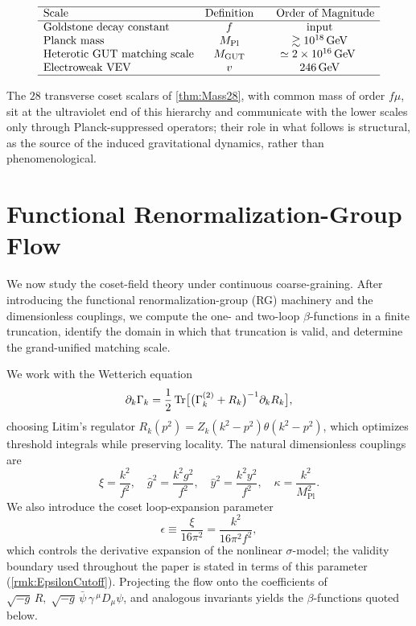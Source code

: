 \documentclass[pdflatex,sn-mathphys-num]{sn-jnl}
\theoremstyle{thmstyleone}
\theoremstyle{thmstylethree}%
\theoremstyle{thmstyletwo}%
\begin{document}
\[
\begin{array}{lcc}
\hline
\text{Scale} & \text{Definition} & \hspace{10pt}\text{Order of Magnitude} \\
\hline
\text{Goldstone decay constant} & f & \text{input} \\
\text{Planck mass} & M_{\mathrm{Pl}} & \gtrsim 10^{18}\,\text{GeV} \\
\text{Heterotic GUT matching scale} & M_{\mathrm{GUT}} & \simeq 2\times10^{16}\,\mathrm{GeV}\ \\
\text{Electroweak VEV} & v & 246\,\text{GeV} \\
\hline
\end{array}
\]

The $28$ transverse coset scalars of \autoref{thm:Mass28}, with common mass of
order $f\mu$, sit at the ultraviolet end of this hierarchy and communicate
with the lower scales only through Planck-suppressed operators; their role in
what follows is structural, as the source of the induced gravitational
dynamics, rather than phenomenological.

\section{Functional Renormalization-Group Flow}
\label{sec:FRG}

We now study the coset-field theory under continuous coarse-graining. After
introducing the functional renormalization-group (RG) machinery and the
dimensionless couplings, we compute the one- and two-loop $\beta$-functions in
a finite truncation, identify the domain in which that truncation is valid, and
determine the grand-unified matching scale.

We work with the Wetterich equation
\[
  \partial_{k}\Gamma_{k}
  =\frac12\operatorname{Tr}\bigl[
    \bigl(\Gamma_{k}^{(2)}+R_{k}\bigr)^{-1}
    \partial_{k}R_{k}\bigr],
\]
choosing Litim's regulator
\(
  R_{k}(p^{2})=Z_{k}(k^{2}-p^{2})
  \theta(k^{2}-p^{2})
\),
which optimizes threshold integrals while preserving locality. The natural
dimensionless
couplings are
\[
  \xi=\frac{k^{2}}{f^{2}},\quad
  \hat g^{2}=\frac{k^{2}g^{2}}{f^{2}},\quad
  \hat y^{2}=\frac{k^{2}y^{2}}{f^{2}},\quad
  \kappa=\frac{k^{2}}{M_{\mathrm{Pl}}^{2}}.
\]
We also introduce the coset loop-expansion parameter
\[
  \epsilon\equiv\frac{\xi}{16\pi^{2}}=\frac{k^{2}}{16\pi^{2}f^{2}},
\]
which controls the derivative expansion of the nonlinear $\sigma$-model; the
validity boundary used throughout the paper is stated in terms of this
parameter (\autoref{rmk:EpsilonCutoff}).
Projecting the flow onto the coefficients of
$\sqrt{-g}\,R,\;\sqrt{-g}\,\bar\psi\,\gamma\,^{\mu}D_{\mu}\psi$, and
analogous invariants yields the $\beta$-functions quoted below.
\end{document}

